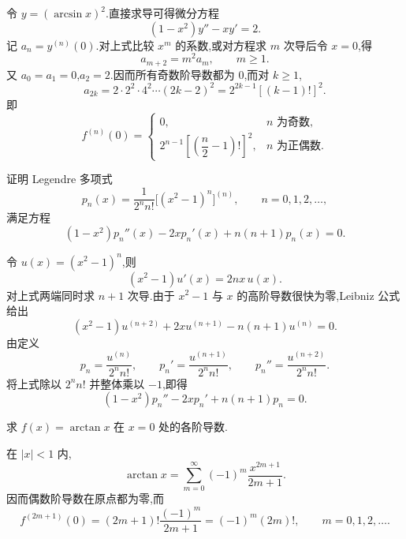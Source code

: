 \begin{solution}
    令 $y=(\arcsin x)^2$.直接求导可得微分方程
    \[
        (1-x^2)y''-xy'=2.
    \]
    记 $a_n=y^{(n)}(0)$.对上式比较 $x^m$ 的系数,或对方程求 $m$ 次导后令 $x=0$,得
    \[
        a_{m+2}=m^2a_m,
        \qquad m\geq1.
    \]
    又 $a_0=a_1=0$,$a_2=2$.因而所有奇数阶导数都为 $0$,而对 $k\geq1$,
    \[
        a_{2k}=2\cdot2^2\cdot4^2\cdots(2k-2)^2
        =2^{2k-1}[(k-1)!]^2.
    \]
    即
    \[
        f^{(n)}(0)=
        \begin{cases}
            0, & n\text{ 为奇数},  \\
            2^{n-1}\left[\left(\dfrac{n}{2}-1\right)!\right]^2,
               & n\text{ 为正偶数}.
        \end{cases}
    \]
\end{solution}

\begin{example}
    证明 Legendre 多项式
    \[
        p_n(x)=\dfrac{1}{2^n n!}\bigl[(x^2-1)^n\bigr]^{(n)},
        \qquad n=0,1,2,\ldots,
    \]
    满足方程
    \[
        (1-x^2)p_n''(x)-2xp_n'(x)+n(n+1)p_n(x)=0.
    \]
\end{example}
\exampleblank

\begin{solution}
    令 $u(x)=(x^2-1)^n$,则
    \[
        (x^2-1)u'(x)=2nx\,u(x).
    \]
    对上式两端同时求 $n+1$ 次导.由于 $x^2-1$ 与 $x$ 的高阶导数很快为零,Leibniz 公式给出
    \[
        (x^2-1)u^{(n+2)}+2x u^{(n+1)}-n(n+1)u^{(n)}=0.
    \]
    由定义
    \[
        p_n=\dfrac{u^{(n)}}{2^n n!},
        \qquad
        p_n'=\dfrac{u^{(n+1)}}{2^n n!},
        \qquad
        p_n''=\dfrac{u^{(n+2)}}{2^n n!}.
    \]
    将上式除以 $2^n n!$ 并整体乘以 $-1$,即得
    \[
        (1-x^2)p_n''-2xp_n'+n(n+1)p_n=0.
    \]
\end{solution}




\begin{example}
    求 $f(x)=\arctan x$ 在 $x=0$ 处的各阶导数.
\end{example}
\exampleblank

\begin{solution}
    在 $|x|<1$ 内,
    \[
        \arctan x
        =\sum\limits_{m=0}^{\infty}(-1)^m\dfrac{x^{2m+1}}{2m+1}.
    \]
    因而偶数阶导数在原点都为零,而
    \[
        f^{(2m+1)}(0)
        =(2m+1)!\dfrac{(-1)^m}{2m+1}
        =(-1)^m(2m)!,
        \qquad m=0,1,2,\ldots.
    \]
\end{solution}

